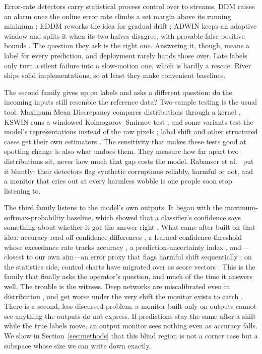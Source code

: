 \documentclass[sigconf,anonymous]{acmart}
\begin{document}
Error-rate detectors carry statistical process control \cite{page1954cusum}
over to streams. DDM raises an alarm once the online error rate climbs a set
margin above its running minimum \cite{gama2004learning}; EDDM reworks the
idea for gradual drift \cite{baena2006eddm}; ADWIN keeps an adaptive window
and splits it when its two halves disagree, with provable false-positive
bounds \cite{bifet2007adwin}. The question they ask is the right one.
Answering it, though, means a label for every prediction, and deployment
rarely hands those over. Late labels only turn a silent failure into a
slow-motion one, which is hardly a rescue. River \cite{montiel2021river}
ships solid implementations, so at least they make convenient baselines.

The second family gives up on labels and asks a different question: do the
incoming inputs still resemble the reference data? Two-sample testing is the
usual tool. Maximum Mean Discrepancy compares distributions through a kernel
\cite{gretton2012kernel}, KSWIN runs a windowed Kolmogorov--Smirnov test
\cite{raab2020kswin}, and some variants test the model's representations
instead of the raw pixels \cite{rabanser2019failing}; label shift and other
structured cases get their own estimators \cite{lipton2018label}. The
sensitivity that makes these tests good at spotting change is also what undoes
them. They measure how far apart two distributions sit, never how much that
gap costs the model. Rabanser et al.\ \cite{rabanser2019failing} put it
bluntly: their detectors flag synthetic corruptions reliably, harmful or not,
and a monitor that cries out at every harmless wobble is one people soon stop
listening to.

The third family listens to the model's own outputs. It began with the
maximum-softmax-probability baseline, which showed that a classifier's
confidence says something about whether it got the answer right
\cite{hendrycks2017baseline}. What came after built on that idea: accuracy
read off confidence differences \cite{guillory2021doc}, a learned confidence
threshold whose exceedance rate tracks accuracy \cite{garg2022atc}, a
prediction-uncertainty index \cite{pudd2025}, and---closest to our own aim---an
error proxy that flags harmful shift sequentially \cite{amoukou2024sequential};
on the statistics side, control charts have migrated over as score vectors
\cite{zhang2023score}. This is the family that finally asks the operator's
question, and much of the time it answers well.
The trouble is the witness. Deep networks are miscalibrated even in
distribution \cite{guo2017calibration}, and get worse under the very shift
the monitor exists to catch \cite{ovadia2019trust}. There is a second, less
discussed problem: a monitor built only on outputs cannot see anything the
outputs do not express. If predictions stay the same after a shift while the
true labels move, an output monitor sees nothing even as accuracy falls. We
show in Section~\ref{sec:methods} that this blind region is not a corner case
but a subspace whose size we can write down exactly.
\end{document}
